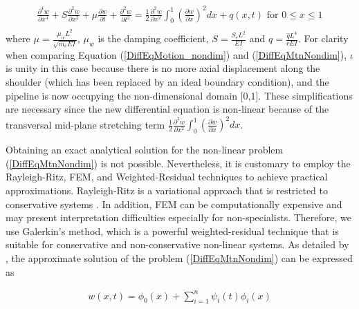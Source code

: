 \documentclass[3p,doublespacing,authoryear,11pt]{elsarticle} %
\begin{document}
 \begin{equation}\label{DiffEqMtnNondim}
 \begin{array}{l } 
\displaystyle  \frac{\partial^4 w}{\partial x^4} +  S \frac{\partial^2 w}{\partial x^2} + \mu \frac{\partial w}{\partial t}  + \frac{\partial^2 w}{\partial t^2} = \frac{1}{2} \frac{\partial^2 w}{\partial x^2} \int_0^1 \left(  \frac{\partial w}{\partial x}  \right)^2 dx+ q (x,t) \text{ for } 0 \le x \le 1 \\
  \end{array}  
\end{equation}
where $\mu= \frac{\mu_w L^2}{\sqrt{m_e EI }}$, $\mu_w$ is the damping coefficient, $S = \frac{S_e L^2}{EI}$ and  $q = \frac{\hat{q} L^4}{rEI}$. For clarity when comparing Equation (\ref{DiffEqMotion_nondim}) and (\ref{DiffEqMtnNondim}), $\iota$ is unity in this case because there is no more axial displacement along the shoulder (which has been replaced by an ideal boundary condition), and the pipeline is now occupying the non-dimensional domain [0,1]. These simplifications are necessary since the new differential equation is non-linear because of the transversal mid-plane stretching term $\displaystyle \frac{1}{2} \frac{\partial^2 w}{\partial x^2} \int_0^1 \left(  \frac{\partial w}{\partial x}  \right)^2 dx$. %

Obtaining an exact analytical solution for the non-linear problem (\ref{DiffEqMtnNondim}) is not possible. Nevertheless, it is customary to employ the Rayleigh-Ritz, FEM, and Weighted-Residual techniques to achieve practical approximations. Rayleigh-Ritz is a variational approach that is restricted to conservative systems \citep{Meirovitch_2001}. In addition, FEM can be computationally expensive and may present interpretation difficulties especially for non-specialists. Therefore, we use Galerkin's method, which is a powerful weighted-residual technique that is suitable for conservative and non-conservative non-linear systems. As detailed by \cite{Meirovitch_2001}, the approximate solution of the problem (\ref{DiffEqMtnNondim}) can be expressed as

 \begin{equation}\label{Galerkin_solution}
 \begin{array}{l } 
\displaystyle  w(x,t) = \phi_0(x) + \sum_{i=1}^n \psi_i(t) \phi_i(x) 
  \end{array}  
\end{equation}
\end{document}

